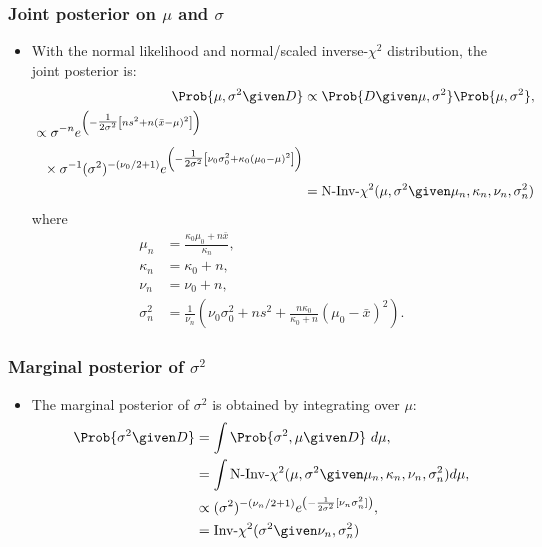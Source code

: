 \documentclass{slides}
\begin{document}
\begin{frame}
	\frametitle{Joint posterior on $\mu$ and $\sigma$}
	\begin{itemize}
		\item With the normal likelihood and normal/scaled inverse-$\chi^2$ distribution, the joint posterior is:
			\begin{align*}
				\Prob{\mu, \sigma^2 \given D} &\propto \Prob{D\given \mu, \sigma^2} \Prob{\mu,\sigma^2},\\
				\begin{split}
				&\propto\sigma^{-n} e^{\left( -\tfrac{1}{2\sigma^2}\left[n s^2 + n(\bar{x}-\mu)^2\right] \right)}\\
				&\phantom{\propto}\times \sigma^{-1}(\sigma^2)^{-(\nu_0/2+1)} e^{\left(-\tfrac{1}{2\sigma^2}\left[ \nu_0\sigma^2_0 + \kappa_0(\mu_0  - \mu)^2 \right]\right)}
				\end{split}\\
				& = \textrm{N-Inv-}\chi^2(\mu, \sigma^2 \given \mu_n, \kappa_n, \nu_n, \sigma_n^2)
			\end{align*}
		where 
		\begin{align*}
			\mu_n &= \frac{\kappa_0\mu_0 + n\bar{x}}{\kappa_n},\\
			 \kappa_n     &= \kappa_0 + n,\\
			 \nu_n &= \nu_0 + n,\\
			 \sigma_n^2 &= \frac{1}{\nu_n}\left( \nu_0\sigma_0^2 + ns^2 + \frac{n\kappa_0}{\kappa_0 + n}(\mu_0 - \bar{x})^2\right).
		\end{align*}
	\end{itemize}
\end{frame}


\begin{frame}
	\frametitle{Marginal posterior of $\sigma^2$}

	\begin{itemize}
		\item The marginal posterior of $\sigma^2$ is obtained by integrating over $\mu$:
			\begin{align*}
				\Prob{\sigma^2 \given D} &= \int \Prob{\sigma^2, \mu\given D}\ d\mu,\\
				&= \int \textrm{N-Inv-}\chi^2(\mu, \sigma^2 \given \mu_n, \kappa_n, \nu_n, \sigma_n^2) d\mu,\\
				&\propto (\sigma^2)^{-(\nu_n/2+1)}e^{\left(-\frac{1}{2\sigma^2}[\nu_n\sigma_n^2]\right)},\\
				&= \textrm{Inv-}\chi^2(\sigma^2\given\nu_n, \sigma^2_n)
			\end{align*}
	\end{itemize}
\end{frame}
\end{document}

